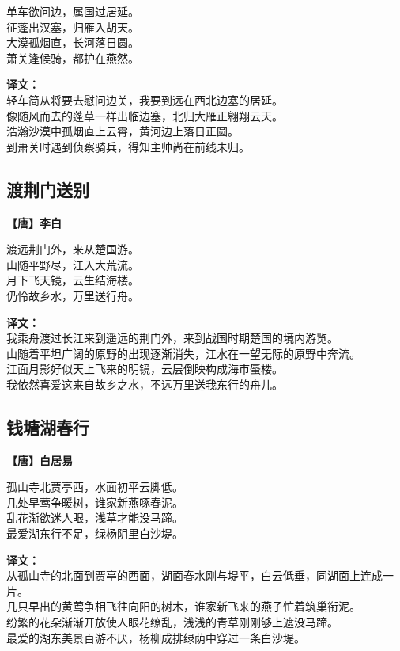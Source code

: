 单车欲问边，属国过居延。\\
征蓬出汉塞，归雁入胡天。\\
大漠孤烟直，长河落日圆。\\
萧关逢候骑，都护在燕然。

\bigskip
\noindent\textbf{译文：}\\
轻车简从将要去慰问边关，我要到远在西北边塞的居延。\\
像随风而去的蓬草一样出临边塞，北归大雁正翱翔云天。\\
浩瀚沙漠中孤烟直上云霄，黄河边上落日正圆。\\
到萧关时遇到侦察骑兵，得知主帅尚在前线未归。


\subsection*{渡荆门送别}
\textbf{【唐】李白}

渡远荆门外，来从楚国游。\\
山随平野尽，江入大荒流。\\
月下飞天镜，云生结海楼。\\
仍怜故乡水，万里送行舟。

\bigskip
\noindent\textbf{译文：}\\
我乘舟渡过长江来到遥远的荆门外，来到战国时期楚国的境内游览。\\
山随着平坦广阔的原野的出现逐渐消失，江水在一望无际的原野中奔流。\\
江面月影好似天上飞来的明镜，云层倒映构成海市蜃楼。\\
我依然喜爱这来自故乡之水，不远万里送我东行的舟儿。


\subsection*{钱塘湖春行}
\textbf{【唐】白居易}

孤山寺北贾亭西，水面初平云脚低。\\
几处早莺争暖树，谁家新燕啄春泥。\\
乱花渐欲迷人眼，浅草才能没马蹄。\\
最爱湖东行不足，绿杨阴里白沙堤。

\bigskip
\noindent\textbf{译文：}\\
从孤山寺的北面到贾亭的西面，湖面春水刚与堤平，白云低垂，同湖面上连成一片。\\
几只早出的黄莺争相飞往向阳的树木，谁家新飞来的燕子忙着筑巢衔泥。\\
纷繁的花朵渐渐开放使人眼花缭乱，浅浅的青草刚刚够上遮没马蹄。\\
最爱的湖东美景百游不厌，杨柳成排绿荫中穿过一条白沙堤。

